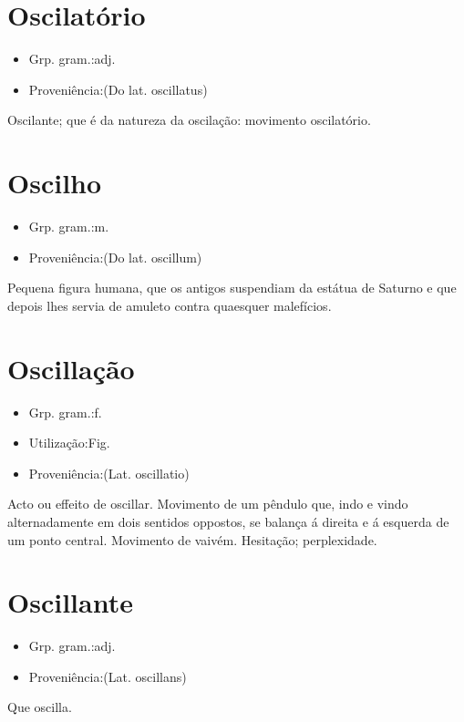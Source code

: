 \section{Oscilatório}
\begin{itemize}
\item {Grp. gram.:adj.}
\end{itemize}
\begin{itemize}
\item {Proveniência:(Do lat. \textunderscore oscillatus\textunderscore )}
\end{itemize}
Oscilante; que é da natureza da oscilação: \textunderscore movimento oscilatório\textunderscore .
\section{Oscilho}
\begin{itemize}
\item {Grp. gram.:m.}
\end{itemize}
\begin{itemize}
\item {Proveniência:(Do lat. \textunderscore oscillum\textunderscore )}
\end{itemize}
Pequena figura humana, que os antigos suspendiam da estátua de Saturno e que depois lhes servia de amuleto contra quaesquer malefícios.
\section{Oscillação}
\begin{itemize}
\item {Grp. gram.:f.}
\end{itemize}
\begin{itemize}
\item {Utilização:Fig.}
\end{itemize}
\begin{itemize}
\item {Proveniência:(Lat. \textunderscore oscillatio\textunderscore )}
\end{itemize}
Acto ou effeito de oscillar.
Movimento de um pêndulo que, indo e vindo alternadamente em dois sentidos oppostos, se balança á direita e á esquerda de um ponto central.
Movimento de vaivém.
Hesitação; perplexidade.
\section{Oscillante}
\begin{itemize}
\item {Grp. gram.:adj.}
\end{itemize}
\begin{itemize}
\item {Proveniência:(Lat. \textunderscore oscillans\textunderscore )}
\end{itemize}
Que oscilla.
